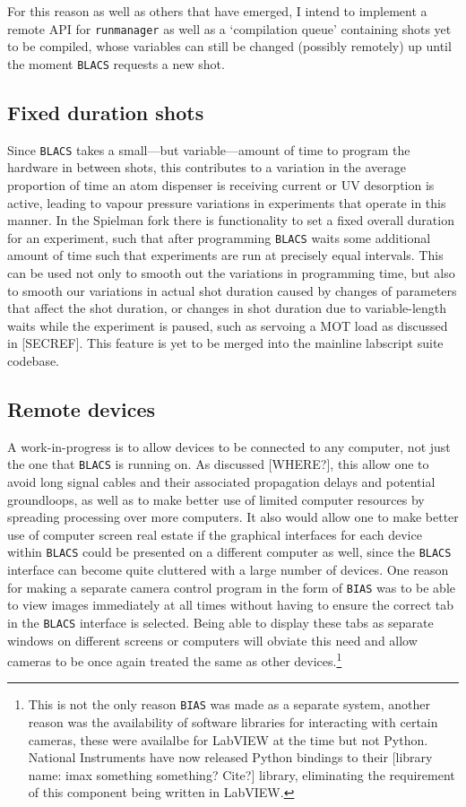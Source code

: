 For this reason as well as others that have emerged, I intend to implement a remote API for \texttt{runmanager} as well as a `compilation queue' containing shots yet to be compiled, whose variables can still be changed (possibly remotely) up until the moment \texttt{BLACS} requests a new shot.

\subsection{Fixed duration shots}

Since \texttt{BLACS} takes a small---but variable---amount of time to program the hardware in between shots, this contributes to a variation in the average proportion of time an atom dispenser is receiving current or UV desorption is active, leading to vapour pressure variations in experiments that operate in this manner. In the Spielman fork there is functionality to set a fixed overall duration for an experiment, such that after programming \texttt{BLACS} waits some additional amount of time such that experiments are run at precisely equal intervals. This can be used not only to smooth out the variations in programming time, but also to smooth our variations in actual shot duration caused by changes of parameters that affect the shot duration, or changes in shot duration due to variable-length waits while the experiment is paused, such as servoing a MOT load as discussed in [SECREF]. This feature is yet to be merged into the mainline labscript suite codebase.

\subsection{Remote devices}

A work-in-progress is to allow devices to be connected to any computer, not just the one that \texttt{BLACS} is running on. As discussed [WHERE?], this allow one to avoid long signal cables and their associated propagation delays and potential groundloops, as well as to make better use of limited computer resources by spreading processing over more computers. It also would allow one to make better use of computer screen real estate if the graphical interfaces for each device within \texttt{BLACS} could be presented on a different computer as well, since the \texttt{BLACS} interface can become quite cluttered with a large number of devices. One reason for making a separate camera control program in the form of \texttt{BIAS} was to be able to view images immediately at all times without having to ensure the correct tab in the \texttt{BLACS} interface is selected. Being able to display these tabs as separate windows on different screens or computers will obviate this need and allow cameras to be once again treated the same as other devices.\footnote{This is not the only reason \texttt{BIAS} was made as a separate system, another reason was the availability of software libraries for interacting with certain cameras, these were availalbe for LabVIEW at the time but not Python. National Instruments have now released Python bindings to their [library name: imax something something? Cite?] library, eliminating the requirement of this component being written in LabVIEW.}

